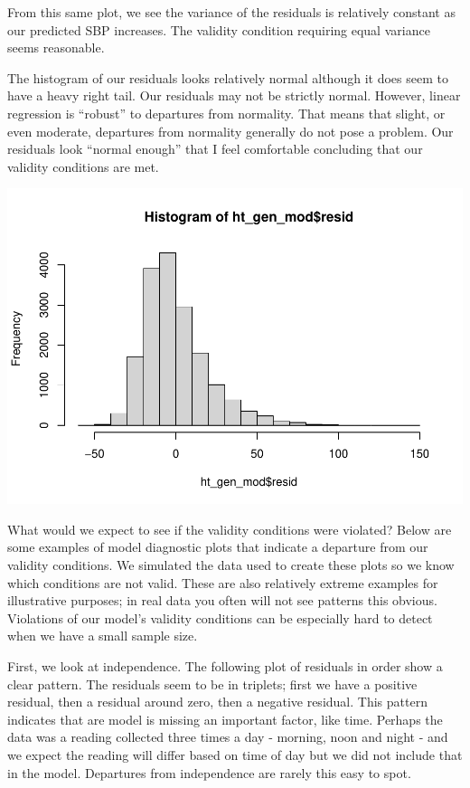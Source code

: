\documentclass[]{book}
\newenvironment{Shaded}{\begin{snugshade}}{\end{snugshade}}
\newcommand{\KeywordTok}[1]{\textcolor[rgb]{0.13,0.29,0.53}{\textbf{#1}}}
\newcommand{\NormalTok}[1]{#1}
\newcommand{\OperatorTok}[1]{\textcolor[rgb]{0.81,0.36,0.00}{\textbf{#1}}}
\begin{document}
From this same plot, we see the variance of the residuals is relatively constant as our predicted SBP increases. The validity condition requiring equal variance seems reasonable.

The histogram of our residuals looks relatively normal although it does seem to have a heavy right tail. Our residuals may not be strictly normal. However, linear regression is ``robust'' to departures from normality. That means that slight, or even moderate, departures from normality generally do not pose a problem. Our residuals look ``normal enough'' that I feel comfortable concluding that our validity conditions are met.

\begin{Shaded}
\end{Shaded}

\includegraphics{MA206supplement_files/figure-latex/unnamed-chunk-9-1.pdf}

What would we expect to see if the validity conditions were violated? Below are some examples of model diagnostic plots that indicate a departure from our validity conditions. We simulated the data used to create these plots so we know which conditions are not valid. These are also relatively extreme examples for illustrative purposes; in real data you often will not see patterns this obvious. Violations of our model's validity conditions can be especially hard to detect when we have a small sample size.

First, we look at independence. The following plot of residuals in order show a clear pattern. The residuals seem to be in triplets; first we have a positive residual, then a residual around zero, then a negative residual. This pattern indicates that are model is missing an important factor, like time. Perhaps the data was a reading collected three times a day - morning, noon and night - and we expect the reading will differ based on time of day but we did not include that in the model. Departures from independence are rarely this easy to spot.
\end{document}
